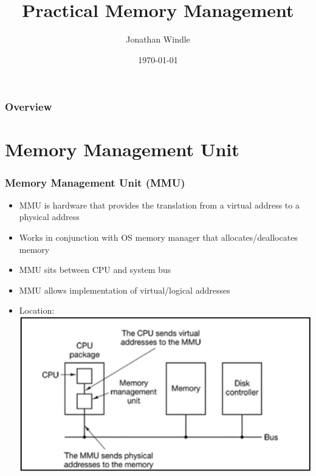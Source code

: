 \documentclass{beamer}
\title[Practical Memory Management]{Practical Memory Management} %
\author{Jonathan Windle} %
\institute[UEA] %
{
University of East Anglia \\ %
\medskip
\textit{J.Windle@uea.ac.uk} %
}
\date{\today} %
\begin{document}
\begin{frame}
\titlepage %
\end{frame}

\begin{frame}[allowframebreaks]
\frametitle{Overview} %
\tableofcontents %
\end{frame}

\section{Memory Management Unit}
\begin{frame}
\frametitle{Memory Management Unit (MMU)}
\begin{itemize}
\item MMU is hardware that provides the translation from a virtual address to a physical address
\item Works in conjunction with OS memory manager that allocates/deallocates memory
\item MMU sits between CPU and system bus
\item MMU allows implementation of virtual/logical addresses
\item Location:\\
\includegraphics[scale=.3]{loc.png}
\end{itemize}
\end{frame}
\end{document}

